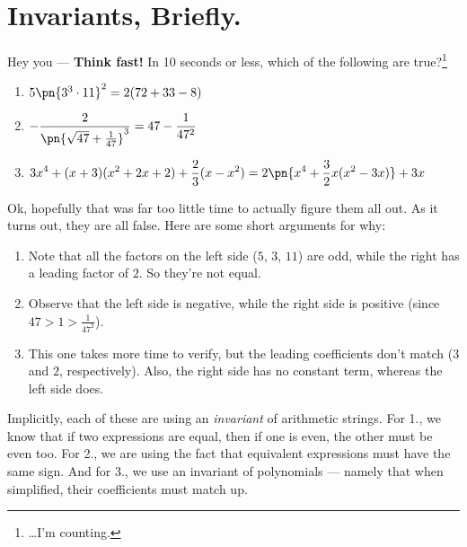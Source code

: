 \section{Invariants, Briefly.}\label{sec:invariants-briefly}
Hey you --- {\bfseries Think fast!} In 10 seconds or less, which of
the following are true?\footnote{\ldots I'm counting.}
\begin{leftbar}
  \begin{enumerate}[leftmargin=2em]
      \small
    \item $5\pn{3^3 \cdot 11}^2 = 2 (72 + 33 - 8)$
    \item $\displaystyle -\frac{2}{\pn{\sqrt{47} +
      \frac{1}{47}}^{3}} = 47 - \frac{1}{47^2}$
    \item $\displaystyle 3x^4 + (x + 3)(x^2 + 2x + 2) +
      \frac{2}{3}(x - x^2) = 2\pn{x^4 + \frac{3}{2}x(x^2 - 3x)} +
      3x$
  \end{enumerate}
\end{leftbar}
Ok, hopefully that was far too little time to actually figure them all
out. As it turns out, they are all false. Here are some short
arguments for why:
\begin{leftbar}
  \begin{enumerate}
    \item Note that all the factors on the left side ($5$, $3$, $11$)
      are odd, while the right has a leading factor of $2$. So they're
      not equal.
    \item Observe that the left side is negative, while the right side
      is positive (since $47 > 1 > \frac{1}{47^2}$).
    \item This one takes more time to verify, but the leading
      coefficients don't match ($3$ and $2$, respectively). Also, the
      right side has no constant term, whereas the left side does.
  \end{enumerate}
\end{leftbar}
Implicitly, each of these are using an \emph{invariant} of arithmetic
strings. For 1., we know that if two expressions are equal, then if
one is even, the other must be even too. For 2., we are using the fact
that equivalent expressions must have the same sign. And for 3., we
use an invariant of polynomials --- namely that when simplified, their
coefficients must match up.

